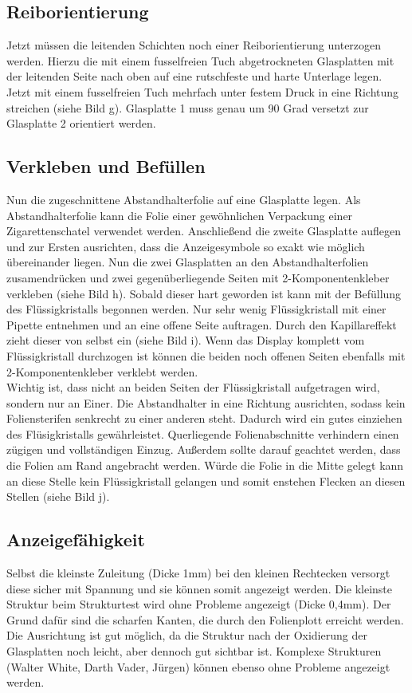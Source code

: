 \subsection{Reiborientierung}

Jetzt müssen die leitenden Schichten noch einer Reiborientierung unterzogen werden. Hierzu die mit einem fusselfreien Tuch abgetrockneten Glasplatten mit der leitenden Seite nach oben auf eine rutschfeste und harte Unterlage legen. Jetzt mit einem fusselfreien Tuch mehrfach unter festem Druck in eine Richtung streichen (siehe Bild g). Glasplatte 1 muss genau um 90 Grad versetzt zur Glasplatte 2 orientiert werden.

\subsection{Verkleben und Befüllen}

Nun die zugeschnittene Abstandhalterfolie auf eine Glasplatte legen. Als Abstandhalterfolie kann die Folie einer gewöhnlichen Verpackung einer Zigarettenschatel verwendet werden. 
Anschließend die zweite Glasplatte auflegen und zur Ersten ausrichten, dass die Anzeigesymbole so exakt wie möglich übereinander liegen. Nun die zwei Glasplatten an den Abstandhalterfolien zusamendrücken und zwei gegenüberliegende Seiten mit 2-Komponentenkleber verkleben (siehe Bild h). Sobald dieser hart geworden ist kann mit der Befüllung des Flüssigkristalls begonnen werden.
Nur sehr wenig Flüssigkristall mit einer Pipette entnehmen und an eine offene Seite auftragen. Durch den Kapillareffekt zieht dieser von selbst ein (siehe Bild i). Wenn das Display komplett vom Flüssigkristall durchzogen ist können die beiden noch offenen Seiten ebenfalls mit 2-Komponentenkleber verklebt werden.\\

Wichtig ist, dass nicht an beiden Seiten der Flüssigkristall aufgetragen wird, sondern nur an Einer.
Die Abstandhalter in eine Richtung ausrichten, sodass kein Foliensterifen senkrecht zu einer anderen steht. Dadurch wird ein gutes einziehen des Flüsigkristalls gewährleistet. Querliegende Folienabschnitte verhindern einen zügigen und vollständigen Einzug.
Außerdem sollte darauf geachtet werden, dass die Folien am Rand angebracht werden. Würde die Folie in die Mitte gelegt kann an diese Stelle kein Flüssigkristall gelangen und somit enstehen Flecken an diesen Stellen (siehe Bild j).

\subsection{Anzeigefähigkeit}
Selbst die kleinste Zuleitung (Dicke 1mm) bei den kleinen Rechtecken versorgt diese sicher mit Spannung und sie können somit angezeigt werden. Die kleinste Struktur beim Strukturtest wird ohne Probleme angezeigt (Dicke 0,4mm). Der Grund dafür sind die scharfen Kanten, die durch den Folienplott erreicht werden. Die Ausrichtung ist gut möglich, da die Struktur nach der Oxidierung der Glasplatten noch leicht, aber dennoch gut sichtbar ist. Komplexe Strukturen (Walter White, Darth Vader, Jürgen) können ebenso ohne Probleme angezeigt werden.

